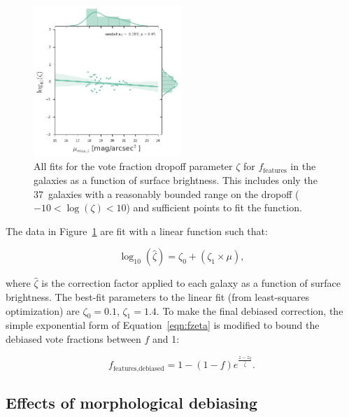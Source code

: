 \documentclass[twocolumn]{aastex6}
\begin{document}
\begin{figure}
\center
\includegraphics[width=0.50\textwidth]{figures/zeta_mu.png}
\caption{All fits for the vote fraction dropoff parameter $\zeta$ for $f_\textrm{features}$ in the \ferengi{} galaxies as a function of surface brightness. This includes only the 37~galaxies with a reasonably bounded range on the dropoff ($-10<\log(\zeta)<10$) and sufficient points to fit the function.}
\label{fig:zeta_mu}
\end{figure}

The data in Figure~\ref{fig:zeta_mu} are fit with a linear function such that:

\begin{equation}
\log_{10}(\hat\zeta) = \zeta_0 + (\zeta_1 \times \mu),
\label{eqn:zetafit}
\end{equation}

\noindent where $\hat\zeta$ is the correction factor applied to each galaxy as a function of surface brightness. The best-fit parameters to the linear fit (from least-squares optimization) are $\zeta_0=0.1$, $\zeta_1=1.4$. To make the final debiased correction, the simple exponential form of Equation~\ref{eqn:fzeta} is modified to bound the debiased vote fractions between $f$ and 1:

\begin{equation}
f_\textrm{features,debiased} = 1 - (1 - f)e^{\frac{z-z_0}{\hat\zeta}}.
\label{eqn:fzeta_mod}
\end{equation}

\subsection{Effects of morphological debiasing}\label{ssec:zeta_results}
\end{document}
